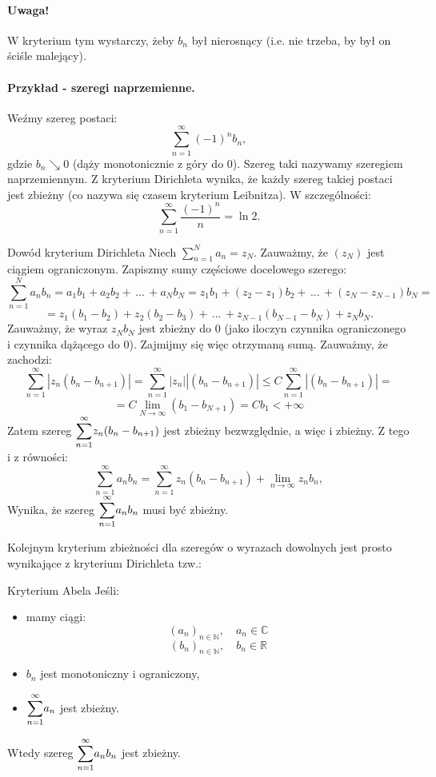 \documentclass{article}
\numberwithin{defi}{section}
\numberwithin{defi}{section}
\newcommand{\R}{\mathbb{R}}
\newcommand{\N}{\mathbb{N}}
\newcommand{\C}{\mathbb{C}}
\newcommand{\oo}{\infty}
\begin{document}
\paragraph*{Uwaga!} W kryterium tym wystarczy, żeby $b_n$ był nierosnący (i.e. nie trzeba, by był on ściśle malejący).
\paragraph{Przykład - szeregi naprzemienne.} Weźmy szereg postaci:
\[\sum_{n=1}^{\oo} (-1)^n b_n,\]
gdzie $b_n \searrow 0$ (dąży monotonicznie z góry do 0). Szereg taki nazywamy szeregiem naprzemiennym. Z kryterium Dirichleta wynika, że każdy szereg takiej postaci jest zbieżny (co nazywa się czasem kryterium Leibnitza). W szczególności:
\[\sum_{n=1}^{\oo} \frac{(-1)^n}{n} = \ln 2.\]
\begin{dow}{Dowód kryterium Dirichleta}
    Niech $\sum_{n=1}^{N} a_n = z_N$. Zauważmy, że $(z_N)$ jest ciągiem ograniczonym. Zapiszmy sumy częściowe docelowego szerego:
    \[\sum_{n=1}^{N} a_n b_n = a_1 b_1 + a_2 b_2 + \, ... \, + a_N b_N = z_1 b_1 + (z_2 - z_1) b_2 + \, ... \, +  (z_N - z_{N-1}) b_N = \]
    \[ = z_1 (b_1 - b_2) + z_2 (b_2 - b_3) + \, ... \, + z_{N-1} (b_{N-1} - b_N) + z_N b_N.\]
    Zauważmy, że wyraz $z_N b_N$ jest zbieżny do 0 (jako iloczyn czynnika ograniczonego i czynnika dążącego do 0).
    Zajmijmy się więc otrzymaną sumą. Zauważmy, że zachodzi:
    \[\sum_{n=1}^{\oo} | z_n (b_n - b_{n+1} )| = \sum_{n=1}^{\oo} | z_n| | (b_n - b_{n+1} )| \leqslant  C \sum_{n=1}^{\oo} | (b_n - b_{n+1} )| =\]
    \[= C \lim_{N\to \oo} (b_1 - b_{N+1}) = C b_1 < + \oo\]
    Zatem szereg $\mathlarger{\sum}_{n=1}^{\oo} z_n ( b_n - b_{n+1})$ jest zbieżny bezwzględnie, a więc i zbieżny.
    Z tego i z równości:
    \[\sum_{n=1}^{\oo} a_n b_n = \sum_{n=1}^{\oo} z_n ( b_n - b_{n+1}) + \lim _{n \to \oo} z_n b_n, \]
    Wynika, że szereg $\mathlarger{\sum}_{n=1}^{\oo} a_n b_n$ musi być zbieżny.
\end{dow}
Kolejnym kryterium zbieżności dla szeregów o wyrazach dowolnych jest prosto wynikające z kryterium Dirichleta tzw.:
\begin{twier}{Kryterium Abela}
    Jeśli:
    \begin{itemize}
        \item mamy ciągi:
              \[(a_n)_{n\in \N}, \quad a_n \in \C \]
              \[(b_n)_{n\in \N}, \quad b_n \in \R\]
        \item $b_n$ jest monotoniczny i ograniczony,
        \item $\mathlarger{\sum}_{n=1}^{\oo} a_n$ jest zbieżny.
    \end{itemize}
    Wtedy szereg $\mathlarger{\sum}_{n=1}^{\oo} a_n b_n$ jest zbieżny.
\end{twier}
\end{document}

